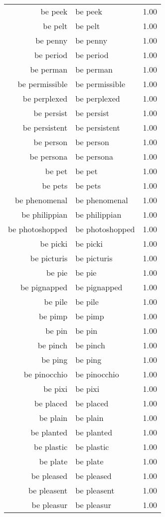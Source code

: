 \begin{table}[ht]
\begin{tabular}{rlr}
  be peek & be peek & 1.00 \\ 
  be pelt & be pelt & 1.00 \\ 
  be penny & be penny & 1.00 \\ 
  be period & be period & 1.00 \\ 
  be perman & be perman & 1.00 \\ 
  be permissible & be permissible & 1.00 \\ 
  be perplexed & be perplexed & 1.00 \\ 
  be persist & be persist & 1.00 \\ 
  be persistent & be persistent & 1.00 \\ 
  be person & be person & 1.00 \\ 
  be persona & be persona & 1.00 \\ 
  be pet & be pet & 1.00 \\ 
  be pets & be pets & 1.00 \\ 
  be phenomenal & be phenomenal & 1.00 \\ 
  be philippian & be philippian & 1.00 \\ 
  be photoshopped & be photoshopped & 1.00 \\ 
  be picki & be picki & 1.00 \\ 
  be picturis & be picturis & 1.00 \\ 
  be pie & be pie & 1.00 \\ 
  be pignapped & be pignapped & 1.00 \\ 
  be pile & be pile & 1.00 \\ 
  be pimp & be pimp & 1.00 \\ 
  be pin & be pin & 1.00 \\ 
  be pinch & be pinch & 1.00 \\ 
  be ping & be ping & 1.00 \\ 
  be pinocchio & be pinocchio & 1.00 \\ 
  be pixi & be pixi & 1.00 \\ 
  be placed & be placed & 1.00 \\ 
  be plain & be plain & 1.00 \\ 
  be planted & be planted & 1.00 \\ 
  be plastic & be plastic & 1.00 \\ 
  be plate & be plate & 1.00 \\ 
  be pleased & be pleased & 1.00 \\ 
  be pleasent & be pleasent & 1.00 \\ 
  be pleasur & be pleasur & 1.00 \\ 

\end{tabular}
\end{table}
